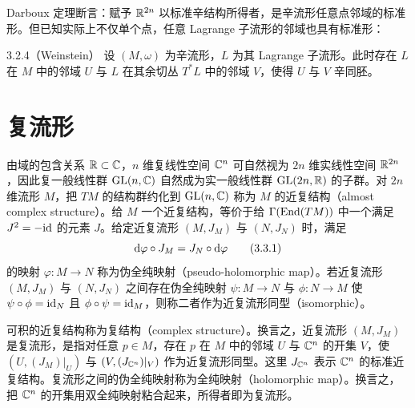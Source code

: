 Darboux 定理断言：赋予 $\mathbb{R}^{2n}$ 以标准辛结构所得者，是辛流形任意点邻域的标准形。但已知实际上不仅单个点，任意 Lagrange 子流形的邻域也具有标准形：

\begin{theorem}{3.2.4（Weinstein）}
  设 $(M,\omega)$ 为辛流形，$L$ 为其 Lagrange 子流形。此时存在 $L$ 在 $M$ 中的邻域 $U$ 与 $L$ 在其余切丛 $T^*L$ 中的邻域 $V$，使得 $U$ 与 $V$ 辛同胚。
\end{theorem}

\section{复流形}

由域的包含关系 $\mathbb{R}\subset\mathbb{C}$，$n$ 维复线性空间 $\mathbb{C}^n$ 可自然视为 $2n$ 维实线性空间 $\mathbb{R}^{2n}$，因此复一般线性群 $\operatorname{GL}(n,\mathbb{C})$ 自然成为实一般线性群 $\operatorname{GL}(2n,\mathbb{R})$ 的子群。对 $2n$ 维流形 $M$，把 $TM$ 的结构群约化到 $\operatorname{GL}(n,\mathbb{C})$ 称为 $M$ 的近复结构（almost complex structure）。给 $M$ 一个近复结构，等价于给 $\Gamma(\operatorname{End}(TM))$ 中一个满足 $J^2=-\mathrm{id}$ 的元素 $J$。给定近复流形 $(M,J_M)$ 与 $(N,J_N)$ 时，满足
\begin{equation}
  \mathrm{d}\varphi\circ J_M=J_N\circ \mathrm{d}\varphi
  \tag{3.3.1}
\end{equation}
的映射 $\varphi\colon M\to N$ 称为伪全纯映射（pseudo-holomorphic map）。若近复流形 $(M,J_M)$ 与 $(N,J_N)$ 之间存在伪全纯映射 $\psi\colon M\to N$ 与 $\phi\colon N\to M$ 使 $\psi\circ\phi=\mathrm{id}_N$ 且 $\phi\circ\psi=\mathrm{id}_M$，则称二者作为近复流形同型（isomorphic）。

可积的近复结构称为复结构（complex structure）。换言之，近复流形 $(M,J_M)$ 是复流形，是指对任意 $p\in M$，存在 $p$ 在 $M$ 中的邻域 $U$ 与 $\mathbb{C}^n$ 的开集 $V$，使 $(U,(J_M)|_U)$ 与 $(V,(J_{\mathbb{C}^n})|_V)$ 作为近复流形同型。这里 $J_{\mathbb{C}^n}$ 表示 $\mathbb{C}^n$ 的标准近复结构。复流形之间的伪全纯映射称为全纯映射（holomorphic map）。换言之，把 $\mathbb{C}^n$ 的开集用双全纯映射粘合起来，所得者即为复流形。


